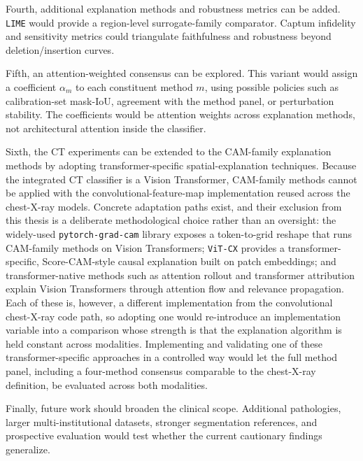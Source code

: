 Fourth, additional explanation methods and robustness metrics can be
added. \texttt{LIME} \cite{ref-lime} would provide a region-level
surrogate-family comparator. Captum infidelity and sensitivity metrics
\cite{ref-captum-docs, ref-infidelity-sensitivity} could triangulate
faithfulness and robustness beyond deletion/insertion curves. 

Fifth, an attention-weighted consensus can be explored. This
variant would assign a coefficient $\alpha_m$ to each constituent
method $m$, using possible policies such as calibration-set
mask-IoU, agreement with the method panel, or perturbation stability.
The coefficients would be attention weights across explanation methods,
not architectural attention inside the classifier.

Sixth, the CT experiments can be extended to the CAM-family explanation
methods by adopting transformer-specific spatial-explanation techniques.
Because the integrated CT classifier is a Vision Transformer,
CAM-family methods cannot be applied with the convolutional-feature-map
implementation reused across the chest-X-ray models. Concrete adaptation
paths exist, and their exclusion from this thesis is a deliberate
methodological choice rather than an oversight: the widely-used
\texttt{pytorch-\allowbreak grad-\allowbreak cam} library \cite{ref-pytorch-gradcam} exposes a
token-to-grid reshape that runs CAM-family methods on Vision
Transformers; \texttt{ViT-\allowbreak CX} \cite{ref-vit-cx} provides a
transformer-specific, Score-CAM-style causal explanation built on patch
embeddings; and transformer-native methods such as attention rollout
\cite{ref-attention-rollout} and transformer attribution
\cite{ref-transformer-attribution} explain Vision Transformers through
attention flow and relevance propagation. Each of these is, however, a
different implementation from the convolutional chest-X-ray code path,
so adopting one would re-introduce an implementation variable into a
comparison whose strength is that the explanation algorithm is held
constant across modalities. 
Implementing and validating one of these transformer-specific
approaches in a controlled way would let the full method panel,
including a four-method consensus comparable to the chest-X-ray
definition, be evaluated across both modalities.

Finally, future work should broaden the clinical scope. Additional
pathologies, larger multi-institutional datasets, stronger segmentation
references, and prospective evaluation would test whether the current
cautionary findings generalize. 

